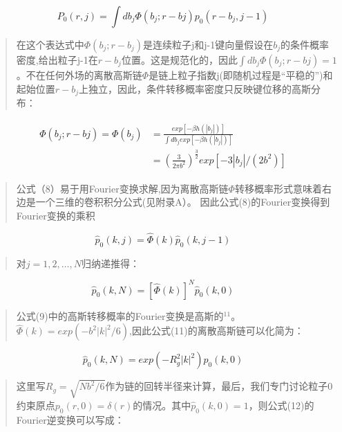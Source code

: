 \documentclass{article}
\begin{document}
\begin{sloppypar}
\begin{CJK}{UTF8}{gkai}
			\begin{equation}
			P_{0}(r,j)=\int db_{j} \varPhi (b_{j};r-b{j})p_{0}(r-b_{j},j-1)
			\end{equation}
			\begin{quotation}
				在这个表达式中$\varPhi (b_{j};r-b_{j})$是连续粒子j和j-1键向量假设在$b_{j}$的条件概率密度,给出粒子j-1在$r-b_{j}$位置。这是规范化的，因此$\int db_{j} \varPhi (b_{j};r-b{j})=1$
				。不在任何外场的离散高斯链$\varPhi$是链上粒子指数j(即随机过程是“平稳的”)和起始位置$r-b_{j}$上独立，因此，条件转移概率密度只反映键位移的高斯分布：
			\end{quotation}
			\begin{equation}
			\begin{split}
			\begin{aligned}
			\varPhi(b_{j};r-b{j})=\varPhi(b_{j})&=\frac{exp[-\beta h(|b_{j}|)]}{\int db_{j}exp[-\beta h(|b_{j}|)]} \\
			&=(\frac{3}{2 \pi b^2})^{\frac{3}{2}}exp[-3|b_{j}| / (2b^2)]
			\end{aligned}
			\end{split}
			\end{equation}
			\begin{quotation}
				公式（8）易于用Fourier变换求解,因为离散高斯链$\varPhi$转移概率形式意味着右边是一个三维的卷积积分公式(见附录A）。 
				因此公式(8)的Fourier变换得到Fourier变换的乘积
			\end{quotation}
			\begin{equation}
			\hat{p}_{0}(k,j)=\hat{\varPhi}(k)\hat{p}_{0}(k,j-1)
			\end{equation}
			\begin{quotation}
				对$j=1,2,\dots ,N$归纳递推得：
			\end{quotation}
			\begin{equation}
			\hat{p}_{0}(k,N)=[\hat{\varPhi}(k)]^N\hat{p}_{0}(k,0)
			\end{equation}
			\begin{quotation}
				公式(9)中的高斯转移概率的Fourier变换是高斯的$^{11}$。$\hat{\varPhi}(k)=exp(-b^2|k|^2/6)$,因此公式(11)的离散高斯链可以化简为：
			\end{quotation}
			\begin{equation}
			\hat{p}_{0}(k,N)=exp(-R_{g}^2|k|^2)\hat{p}_{0}(k,0)
			\end{equation}
			\begin{quotation}
				这里写$R_{g}=\sqrt{Nb^2/6}$作为链的回转半径来计算，最后，我们专门讨论粒子0约束原点$p_{0}(r,0)=\delta(r)$的情况。其中$\hat{p}_{0}(k,0)=1$，则公式(12)的Fourier逆变换可以写成：

\end{quotation}
\end{CJK}
\end{sloppypar}
\end{document}
